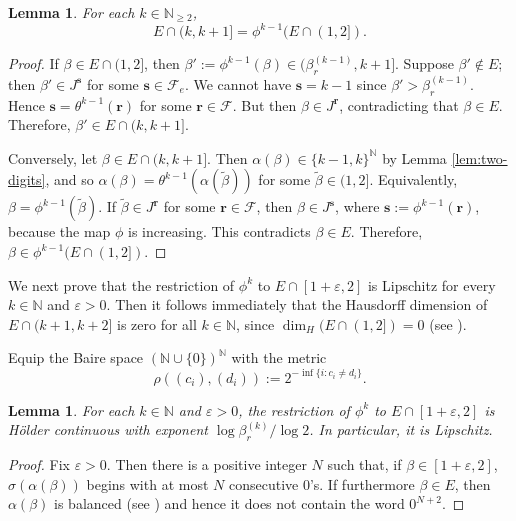 \documentclass[12pt]{amsart}
\newtheorem{lemma}[theorem]{Lemma}
\theoremstyle{definition}
\theoremstyle{remark}
\numberwithin{equation}{section}
\newcommand{\N}{\ensuremath{\mathbb{N}}}
\newcommand{\cF}{\mathcal{F}}
\newcommand{\s}{ {\mathbf{s}}}
\renewcommand{\r}{ {\mathbf{r}}}
\newcommand{\ep}{\varepsilon}
\newcommand{\al}{\alpha}
\newcommand{\si}{\sigma}
\begin{document}
{\begin{lemma} \label{prop:image-of-E}
For each $k\in\N_{\geq 2}$,
\[
E\cap(k,k+1]=\phi^{k-1}(E\cap(1,2]).
\]
\end{lemma}

\begin{proof}
If $\beta\in E\cap(1,2]$, then $\beta':=\phi^{k-1}(\beta)\in(\beta_r^{(k-1)},k+1]$. Suppose $\beta'\not\in E$; then $\beta'\in J^\s$ for some $\s\in \cF_e$. We cannot have $\s=k-1$ since $\beta'>\beta_r^{(k-1)}$. Hence $\s=\theta^{k-1}(\r)$ for some $\r\in\cF$. But then $\beta\in J^\r$, contradicting that $\beta\in E$. Therefore, $\beta'\in E\cap(k,k+1]$.

Conversely, let $\beta\in E\cap (k,k+1]$. Then $\al(\beta)\in\{k-1,k\}^\N$ by Lemma \ref{lem:two-digits}, and so $\al(\beta)=\theta^{k-1}(\al(\tilde{\beta}))$ for some $\tilde{\beta}\in(1,2]$. Equivalently, $\beta=\phi^{k-1}(\tilde{\beta})$. If $\tilde{\beta}\in J^\r$ for some $\r\in\cF$, then $\beta\in J^\s$, where $\s:=\phi^{k-1}(\r)$, because the map $\phi$ is increasing. This contradicts $\beta\in E$. Therefore, $\beta\in\phi^{k-1}(E\cap(1,2])$.
\end{proof}

We next prove that the restriction of $\phi^k$ to $E\cap[1+\ep,2]$ is Lipschitz for every $k\in\N$ and $\ep>0$. Then it follows immediately that the Hausdorff dimension of $E\cap(k+1,k+2]$ is zero for all $k\in\N$, since $\dim_H (E\cap(1,2])=0$ (see \cite[Proposition 5.6]{Allaart-Kong-2021}).

Equip the Baire space $(\N\cup\{0\})^\N$ with the metric
\[
\rho((c_i),(d_i)):=2^{-\inf\{i:c_i\neq d_i\}}.
\]

\begin{lemma} \label{lem:phi-Lipschitz}
For each $k\in\N$ and $\ep>0$, the restriction of $\phi^k$ to $E\cap[1+\ep,2]$ is H\"older continuous with exponent $\log\beta_r^{(k)}/\log 2$. In particular, it is Lipschitz.
\end{lemma}

\begin{proof}
Fix $\ep>0$. Then there is a positive integer $N$ such that, if $\beta\in[1+\ep,2]$, $\si(\al(\beta))$ begins with at most $N$ consecutive 0's. If furthermore $\beta\in E$, then $\al(\beta)$ is balanced (see \cite[Proposition 2.9]{Allaart-Kong-2023})  and hence it does not contain the word $0^{N+2}$.


\end{proof}}
\end{document}
